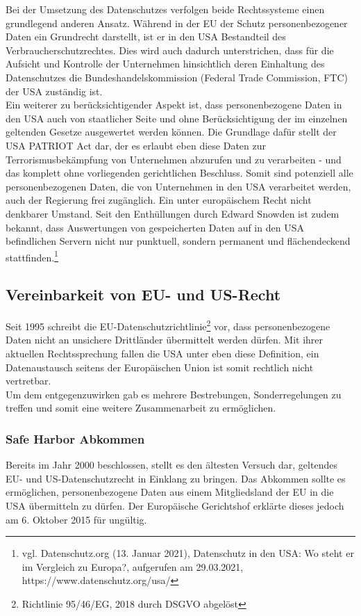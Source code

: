     Bei der Umsetzung des Datenschutzes verfolgen beide Rechtssysteme einen grundlegend anderen Ansatz. Während in der EU der Schutz personenbezogener Daten ein Grundrecht darstellt, ist er in den USA Bestandteil des Verbraucherschutzrechtes. Dies wird auch dadurch unterstrichen, dass für die Aufsicht und Kontrolle der Unternehmen hinsichtlich deren Einhaltung des Datenschutzes die Bundeshandelskommission (Federal Trade Commission, FTC) der USA zuständig ist.\\
    Ein weiterer zu berücksichtigender Aspekt ist, dass personenbezogene Daten in den USA auch von staatlicher Seite und ohne Berücksichtigung der im einzelnen geltenden Gesetze ausgewertet werden können. Die Grundlage dafür stellt der \glqq USA PATRIOT Act\grqq{} dar, der es erlaubt eben diese Daten zur Terrorismusbekämpfung von Unternehmen abzurufen und zu verarbeiten - und das komplett ohne vorliegenden gerichtlichen Beschluss. Somit sind potenziell alle personenbezogenen Daten, die von Unternehmen in den USA verarbeitet werden, auch der Regierung frei zugänglich. Ein unter europäischem Recht nicht denkbarer Umstand. Seit den Enthüllungen durch Edward Snowden ist zudem bekannt, dass Auswertungen von gespeicherten Daten auf in den USA befindlichen Servern nicht nur punktuell, sondern permanent und flächendeckend stattfinden.\footnote{vgl. Datenschutz.org (13. Januar 2021), Datenschutz in den USA: Wo steht er im Vergleich zu Europa?, aufgerufen am 29.03.2021, https://www.datenschutz.org/usa/}

\subsection{Vereinbarkeit von EU- und US-Recht}
    Seit 1995 schreibt die EU-Datenschutzrichtlinie\footnote{Richtlinie 95/46/EG, 2018 durch DSGVO abgelöst} vor, dass personenbezogene Daten nicht an unsichere Drittländer übermittelt werden dürfen. Mit ihrer aktuellen Rechtssprechung fallen die USA unter eben diese Definition, ein Datenaustausch seitens der Europäischen Union ist somit rechtlich nicht vertretbar.\\
    Um dem entgegenzuwirken gab es mehrere Bestrebungen, Sonderregelungen zu treffen und somit eine weitere Zusammenarbeit zu ermöglichen.\\

\subsubsection{Safe Harbor Abkommen}
    Bereits im Jahr 2000 beschlossen, stellt es den ältesten Versuch dar, geltendes EU- und US-Datenschutzrecht in Einklang zu bringen. Das Abkommen sollte es ermöglichen, personenbezogene Daten aus einem Mitgliedsland der EU in die USA übermitteln zu dürfen. Der Europäische Gerichtshof erklärte dieses jedoch am 6. Oktober 2015 für ungültig.\\

